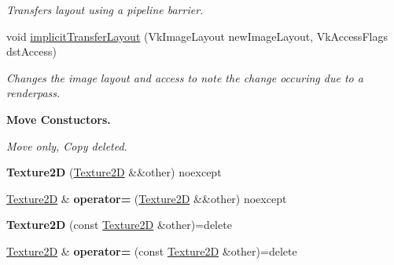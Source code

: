 \begin{DoxyCompactItemize}
\begin{DoxyCompactList}\small\item\em Transfers layout using a pipeline barrier. \end{DoxyCompactList}\item 
void \hyperlink{classblaze_1_1Texture2D_a497022dcbd0538d8507f5818c5ad8b75}{implicit\+Transfer\+Layout} (Vk\+Image\+Layout new\+Image\+Layout, Vk\+Access\+Flags dst\+Access)
\begin{DoxyCompactList}\small\item\em Changes the image layout and access to note the change occuring due to a renderpass. \end{DoxyCompactList}\end{DoxyCompactItemize}
\begin{Indent}\textbf{ Move Constuctors.}\par
{\em Move only, Copy deleted. }\begin{DoxyCompactItemize}
\item 
\mbox{\label{classblaze_1_1Texture2D_a69c8ccf57480ae64384d2afa23c3db03}} 
{\bfseries Texture2D} (\hyperlink{classblaze_1_1Texture2D}{Texture2D} \&\&other) noexcept
\item 
\mbox{\label{classblaze_1_1Texture2D_aa5ae3a40bbd85081e27cd016237cde9a}} 
\hyperlink{classblaze_1_1Texture2D}{Texture2D} \& {\bfseries operator=} (\hyperlink{classblaze_1_1Texture2D}{Texture2D} \&\&other) noexcept
\item 
\mbox{\label{classblaze_1_1Texture2D_a4ae63b40d403f6408d07feaae9a7f896}} 
{\bfseries Texture2D} (const \hyperlink{classblaze_1_1Texture2D}{Texture2D} \&other)=delete
\item 
\mbox{\label{classblaze_1_1Texture2D_a24cc9c38ae303a41cc16146c5b371456}} 
\hyperlink{classblaze_1_1Texture2D}{Texture2D} \& {\bfseries operator=} (const \hyperlink{classblaze_1_1Texture2D}{Texture2D} \&other)=delete
\end{DoxyCompactItemize}
\end{Indent}
